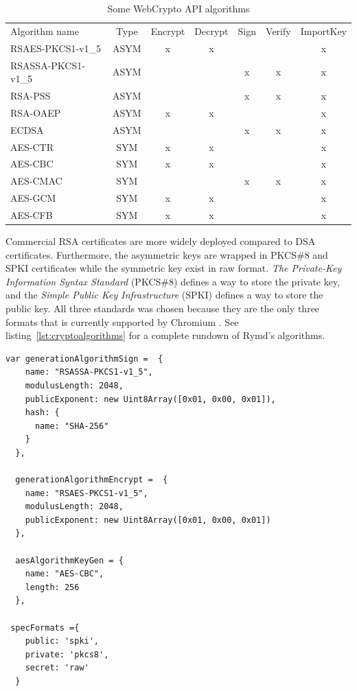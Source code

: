 \begin{table}[ht]
\centering
\begin{tabular}{lcccccc}
Algorithm name & Type & Encrypt & Decrypt & Sign & Verify & ImportKey \\
RSAES-PKCS1-v1\_5 & ASYM & x & x &  &  & x \\
RSASSA-PKCS1-v1\_5 & ASYM &  &  & x & x & x \\
RSA-PSS & ASYM &  &  & x & x & x \\
RSA-OAEP & ASYM & x & x &  &  & x \\
ECDSA & ASYM &  &  & x & x & x \\
AES-CTR & SYM & x & x &  &  & x \\
AES-CBC & SYM & x & x &  &  & x \\
AES-CMAC & SYM &  &  & x & x & x \\
AES-GCM & SYM & x & x &  &  & x \\
AES-CFB & SYM & x & x &  &  & x
\end{tabular}
\caption{Some WebCrypto API algorithms}
\label{table:webcryptoapi}
\end{table}

Commercial RSA certificates are more widely deployed compared to DSA certificates. Furthermore, the asymmetric keys are wrapped in PKCS\#8 and SPKI certificates while the symmetric key exist in raw format. \emph{The Private-Key Information Syntax Standard} (PKCS\#8) defines a way to store the private key, and the \emph{Simple Public Key Infrastructure} (SPKI) defines a way to store the public key. All three standards was chosen because they are the only three formats that is currently supported by Chromium \cite{ImplementedChromium:Online}. See listing~\ref{lst:cryptoalgorithms} for a complete rundown of Rymd's algorithms.

\begin{Code}
\begin{lstlisting}[caption={Algorithms implemented}, label={lst:cryptoalgorithms}]
  var generationAlgorithmSign =  {
    name: "RSASSA-PKCS1-v1_5",
    modulusLength: 2048,
    publicExponent: new Uint8Array([0x01, 0x00, 0x01]),
    hash: {
      name: "SHA-256"
    }
  },

  generationAlgorithmEncrypt =  {
    name: "RSAES-PKCS1-v1_5",
    modulusLength: 2048,
    publicExponent: new Uint8Array([0x01, 0x00, 0x01])
  },

  aesAlgorithmKeyGen = {
    name: "AES-CBC",
    length: 256
  },

 specFormats ={
    public: 'spki',
    private: 'pkcs8',
    secret: 'raw'
  }
\end{lstlisting}
\end{Code}

